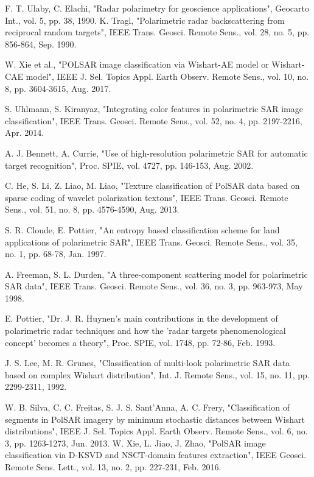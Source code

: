 \documentclass[11pt, a4paper, onecolumn, oneside]{article}
\begin{document}
\begin{thebibliography}{35}
 F. T. Ulaby, C. Elachi, "Radar polarimetry for geoscience applications", Geocarto Int., vol. 5, pp. 38, 1990.
 K. Tragl, "Polarimetric radar backscattering from reciprocal random targets", IEEE Trans. Geosci. Remote Sens., vol. 28, no. 5, pp. 856-864, Sep. 1990.

 	W. Xie et al., "POLSAR image classification via Wishart-AE model or Wishart-CAE model", IEEE J. Sel. Topics Appl. Earth Observ. Remote Sens., vol. 10, no. 8, pp. 3604-3615, Aug. 2017.

 	S. Uhlmann, S. Kiranyaz, "Integrating color features in polarimetric SAR image classification", IEEE Trans. Geosci. Remote Sens., vol. 52, no. 4, pp. 2197-2216, Apr. 2014.

 	A. J. Bennett, A. Currie, "Use of high-resolution polarimetric SAR for automatic target recognition", Proc. SPIE, vol. 4727, pp. 146-153, Aug. 2002.

 C. He, S. Li, Z. Liao, M. Liao, "Texture classification of PolSAR data based on sparse coding of wavelet polarization textons", IEEE Trans. Geosci. Remote Sens., vol. 51, no. 8, pp. 4576-4590, Aug. 2013.

 	S. R. Cloude, E. Pottier, "An entropy based classification scheme for land applications of polarimetric SAR", IEEE Trans. Geosci. Remote Sens., vol. 35, no. 1, pp. 68-78, Jan. 1997.

 A. Freeman, S. L. Durden, "A three-component scattering model for polarimetric SAR data", IEEE Trans. Geosci. Remote Sens., vol. 36, no. 3, pp. 963-973, May 1998.

 E. Pottier, "Dr. J. R. Huynen’s main contributions in the development of polarimetric radar techniques and how the ’radar targets phenomenological concept’ becomes a theory", Proc. SPIE, vol. 1748, pp. 72-86, Feb. 1993.

J. S. Lee, M. R. Grunes, "Classification of multi-look polarimetric SAR data based on complex Wishart distribution", Int. J. Remote Sens., vol. 15, no. 11, pp. 2299-2311, 1992.

	W. B. Silva, C. C. Freitas, S. J. S. Sant’Anna, A. C. Frery, "Classification of segments in PolSAR imagery by minimum stochastic distances between Wishart distributions", IEEE J. Sel. Topics Appl. Earth Observ. Remote Sens., vol. 6, no. 3, pp. 1263-1273, Jun. 2013.
W. Xie, L. Jiao, J. Zhao, "PolSAR image classification via D-KSVD and NSCT-domain features extraction", IEEE Geosci. Remote Sens. Lett., vol. 13, no. 2, pp. 227-231, Feb. 2016.


\end{thebibliography}
\end{document}
